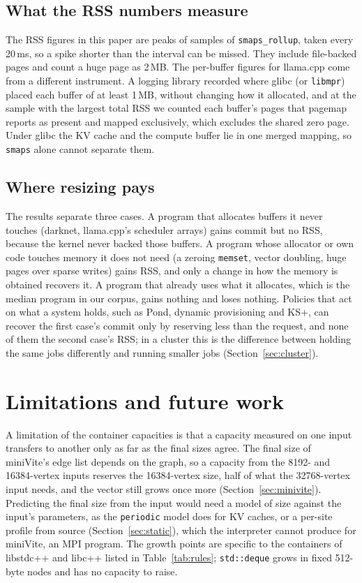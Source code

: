 \documentclass[11pt]{article}
\newcommand{\libmpr}{\texttt{libmpr}}
\newcommand{\secref}[1]{Section~\ref{#1}}
\newcommand{\tabref}[1]{Table~\ref{#1}}
\begin{document}
\subsection{What the RSS numbers measure}

The RSS figures in this paper are peaks of samples of \texttt{smaps\_rollup}, taken every 20\,ms, so a spike
shorter than the interval can be missed. They include file-backed pages and count a huge page as 2\,MB. The
per-buffer figures for llama.cpp come from a different instrument. A logging library recorded where glibc (or
\libmpr{}) placed each buffer of at least 1\,MB, without changing how it allocated, and at the sample with the
largest total RSS we counted each buffer's pages that pagemap reports as present and mapped exclusively, which
excludes the shared zero page. Under glibc the KV cache and the compute buffer lie in one merged mapping, so
\texttt{smaps} alone cannot separate them.

\subsection{Where resizing pays}

The results separate three cases. A program that allocates buffers it never touches (darknet, llama.cpp's
scheduler arrays) gains commit but no RSS, because the kernel never backed those buffers. A program whose
allocator or own code touches memory it does not need (a zeroing \texttt{memset}, vector doubling, huge pages over
sparse writes) gains RSS, and only a change in how the memory is obtained recovers it. A program that already
uses what it allocates, which is the median program in our corpus, gains nothing and loses nothing. Policies
that act on what a system holds, such as Pond, dynamic provisioning and KS+, can recover the first case's
commit only by reserving less than the request, and none of them the second case's RSS; in a cluster this is
the difference between holding the same jobs differently and running smaller jobs (\secref{sec:cluster}).

\section{Limitations and future work}
\label{sec:limits}

A limitation of the container capacities is that a capacity measured on one input transfers to another only as
far as the final sizes agree. The final size of miniVite's edge list depends on the graph, so a capacity from the
8192- and 16384-vertex inputs reserves the 16384-vertex size, half of what the 32768-vertex input needs, and the
vector still grows once more (\secref{sec:minivite}). Predicting the final size from the input would need a model
of size against the input's parameters, as the \texttt{periodic} model does for KV caches, or a per-site profile
from source (\secref{sec:static}), which the interpreter cannot produce for miniVite, an MPI program. The growth points are specific to the containers of libstdc++ and
libc++ listed in \tabref{tab:rules}; \texttt{std::deque} grows in fixed 512-byte nodes and has no capacity to raise.
\end{document}

